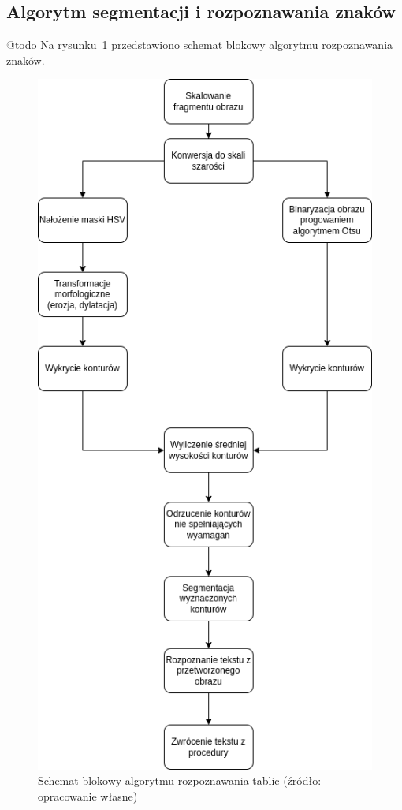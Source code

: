 \subsection{Algorytm segmentacji i rozpoznawania znaków}
@todo
Na rysunku~\ref{fig:characters_alg} przedstawiono schemat blokowy algorytmu rozpoznawania znaków.
\begin{figure}[!ht]
    \centering
    \includegraphics[scale=0.4]{Pictures/characters_alg}
    \caption{Schemat blokowy algorytmu rozpoznawania tablic (źródło: opracowanie własne)}
    \label{fig:characters_alg}
\end{figure}
\FloatBarrier


